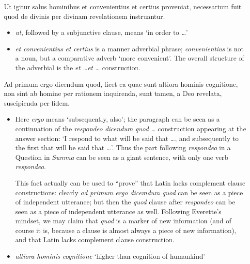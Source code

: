\documentclass[a4paper, 12pt]{article}
\newcommand{\form}[1]{\emph{#1}}
\newcommand{\translate}[1]{`#1'}
\begin{document}
\begin{exe}
    \ex Ut igitur salus hominibus et convenientius et certius proveniat, necessarium fuit quod de divinis per divinam revelationem instruantur.
\end{exe}

\begin{itemize}
    \item \form{ut}, followed by a subjunctive clause, means \translate{in order to \dots}
    \item \form{et convenientius et certius} is a manner adverbial phrase;  
    \form{convenientius} is not a noun, but a comparative adverb \translate{more convenient}.
    The overall structure of the adverbial is the \form{et \dots et \dots} construction.
\end{itemize}

\begin{exe}
    \ex Ad primum ergo dicendum quod, licet ea quae sunt altiora hominis cognitione, non sint ab homine per rationem inquirenda, sunt tamen, a Deo revelata, suscipienda per fidem. 
\end{exe}

\begin{itemize}
    \item Here \form{ergo} means \translate{subsequently, also};
    the paragraph can be seen as a continuation of 
    the \form{respondeo dicendum quod \dots} construction 
    appearing at the answer section: 
    \translate{I respond to what will be said that \dots, 
    and subsequently to the first that will be said that \dots}.
    Thus the part following \form{respondeo} in a Question in \form{Summa} 
    can be seen as a giant sentence, 
    with only one verb \form{respondeo}.
    
    This fact actually can be used to ``prove'' that Latin lacks complement clause constructions:
    clearly \form{ad primum ergo dicemdum quod} can be seen as 
    a piece of independent utterance;
    but then the \form{quod} clause after \form{respondeo}
    can be seen as a piece of independent utterance as well.
    Following Everette's mindset, 
    we may claim that \form{quod} is a marker of new information 
    (and of course it is, because a clause is almost always a piece of new information),
    and that Latin lacks complement clause construction.
    \item \form{altiora hominis cognitione} \translate{higher than cognition of humankind}
\end{itemize}
\end{document}
